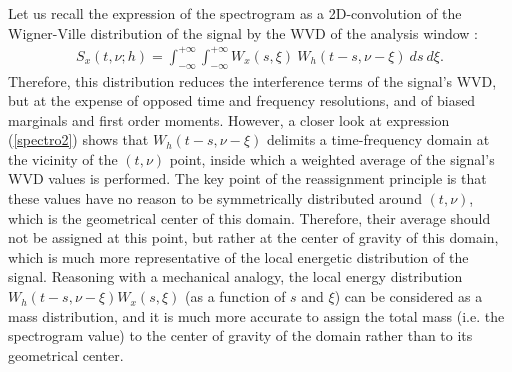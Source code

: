   Let us recall the expression of the spectrogram as a 2D-convolution
of the Wigner-Ville distribution of the signal by the WVD of the
analysis window :
\begin{eqnarray}
\label{spectro2}
S_x(t,\nu;h)=\int_{-\infty}^{+\infty}\int_{-\infty}^{+\infty} W_x(s,\xi)\
W_h(t-s,\nu-\xi)\ ds\ d\xi.	 
\end{eqnarray}
Therefore, this distribution reduces the interference terms of the signal's
WVD, but at the expense of opposed time and frequency resolutions, and of
biased marginals and first order moments. However, a closer look at
expression (\ref{spectro2}) shows that $W_h(t-s,\nu-\xi)$ delimits a
time-frequency domain at the vicinity of the $(t,\nu)$ point, inside which
a weighted average of the signal's WVD values is performed. The key point
of the reassignment principle is that these values have no reason to be
symmetrically distributed around $(t,\nu)$, which is the geometrical center
of this domain. Therefore, their average should not be assigned at this
point, but rather at the center of gravity of this domain, which is much
more representative of the local energetic distribution of the
signal. Reasoning with a mechanical analogy, the local energy distribution
$W_h(t-s,\nu-\xi) W_x(s,\xi)$ (as a function of $s$ and $\xi$) can be
considered as a mass distribution, and it is much more accurate to assign
the total mass (i.e. the spectrogram value) to the center of
gravity of the domain rather than to its geometrical center.

